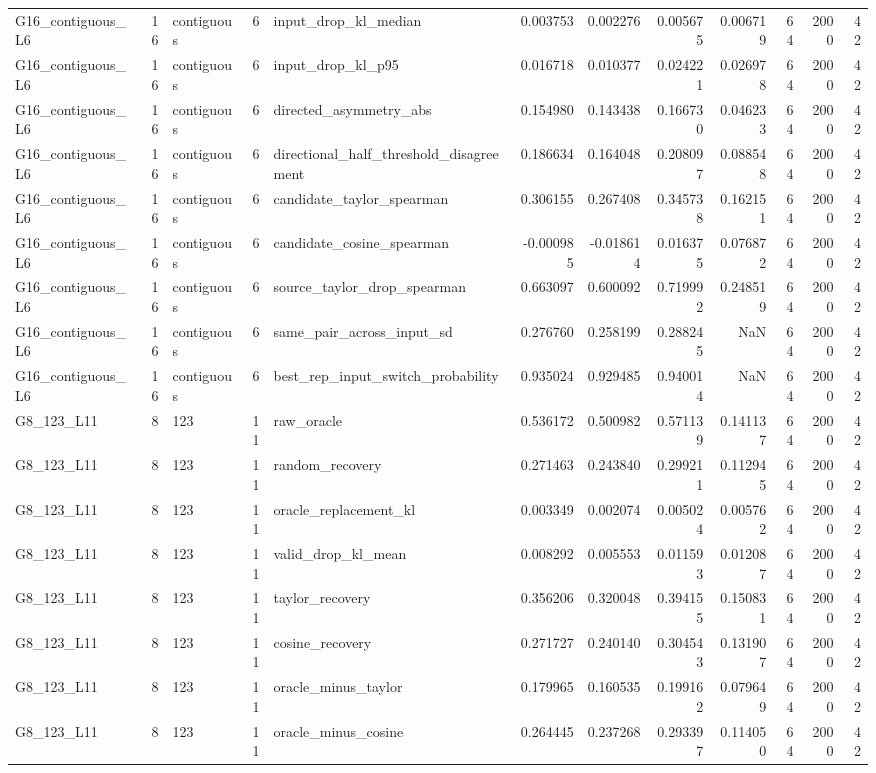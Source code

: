 \begin{tabular}{lrlrlrrrrrrr}
G16_contiguous_L6 & 16 & contiguous & 6 & input_drop_kl_median & 0.003753 & 0.002276 & 0.005675 & 0.006719 & 64 & 2000 & 42 \\
G16_contiguous_L6 & 16 & contiguous & 6 & input_drop_kl_p95 & 0.016718 & 0.010377 & 0.024221 & 0.026978 & 64 & 2000 & 42 \\
G16_contiguous_L6 & 16 & contiguous & 6 & directed_asymmetry_abs & 0.154980 & 0.143438 & 0.166730 & 0.046233 & 64 & 2000 & 42 \\
G16_contiguous_L6 & 16 & contiguous & 6 & directional_half_threshold_disagreement & 0.186634 & 0.164048 & 0.208097 & 0.088548 & 64 & 2000 & 42 \\
G16_contiguous_L6 & 16 & contiguous & 6 & candidate_taylor_spearman & 0.306155 & 0.267408 & 0.345738 & 0.162151 & 64 & 2000 & 42 \\
G16_contiguous_L6 & 16 & contiguous & 6 & candidate_cosine_spearman & -0.000985 & -0.018614 & 0.016375 & 0.076872 & 64 & 2000 & 42 \\
G16_contiguous_L6 & 16 & contiguous & 6 & source_taylor_drop_spearman & 0.663097 & 0.600092 & 0.719992 & 0.248519 & 64 & 2000 & 42 \\
G16_contiguous_L6 & 16 & contiguous & 6 & same_pair_across_input_sd & 0.276760 & 0.258199 & 0.288245 & NaN & 64 & 2000 & 42 \\
G16_contiguous_L6 & 16 & contiguous & 6 & best_rep_input_switch_probability & 0.935024 & 0.929485 & 0.940014 & NaN & 64 & 2000 & 42 \\
G8_123_L11 & 8 & 123 & 11 & raw_oracle & 0.536172 & 0.500982 & 0.571139 & 0.141137 & 64 & 2000 & 42 \\
G8_123_L11 & 8 & 123 & 11 & random_recovery & 0.271463 & 0.243840 & 0.299211 & 0.112945 & 64 & 2000 & 42 \\
G8_123_L11 & 8 & 123 & 11 & oracle_replacement_kl & 0.003349 & 0.002074 & 0.005024 & 0.005762 & 64 & 2000 & 42 \\
G8_123_L11 & 8 & 123 & 11 & valid_drop_kl_mean & 0.008292 & 0.005553 & 0.011593 & 0.012087 & 64 & 2000 & 42 \\
G8_123_L11 & 8 & 123 & 11 & taylor_recovery & 0.356206 & 0.320048 & 0.394155 & 0.150831 & 64 & 2000 & 42 \\
G8_123_L11 & 8 & 123 & 11 & cosine_recovery & 0.271727 & 0.240140 & 0.304543 & 0.131907 & 64 & 2000 & 42 \\
G8_123_L11 & 8 & 123 & 11 & oracle_minus_taylor & 0.179965 & 0.160535 & 0.199162 & 0.079649 & 64 & 2000 & 42 \\
G8_123_L11 & 8 & 123 & 11 & oracle_minus_cosine & 0.264445 & 0.237268 & 0.293397 & 0.114050 & 64 & 2000 & 42 \\

\end{tabular}
